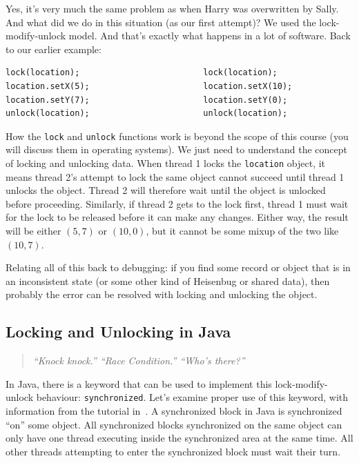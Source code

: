 Yes, it's very much the same problem as when Harry was overwritten by Sally. And what did we do in this situation (as our first attempt)? We used the lock-modify-unlock model. And that's exactly what happens in a lot of software. Back to our earlier example:

\begin{verbatim}
lock(location);                         lock(location);
location.setX(5);                       location.setX(10);
location.setY(7);                       location.setY(0);
unlock(location);                       unlock(location);
\end{verbatim}


How the \texttt{lock} and \texttt{unlock} functions work is beyond the scope of this course (you will discuss them in operating systems). We just need to understand the concept of locking and unlocking data. When thread 1 locks the \texttt{location} object, it means thread 2's attempt to lock the same object cannot succeed until thread 1 unlocks the object. Thread 2 will therefore wait until the object is unlocked before proceeding. Similarly, if thread 2 gets to the lock first, thread 1 must wait for the lock to be released before it can make any changes. Either way, the result will be either $(5,7)$ or $(10,0)$, but it cannot be some mixup of the two like $(10, 7)$.

Relating all of this back to debugging: if you find some record or object that is in an inconsistent state (or some other kind of Heisenbug or shared data), then probably the error can be resolved with locking and unlocking the object.


\subsection*{Locking and Unlocking in Java}

\begin{quote}
\textit{``Knock knock.'' ``Race Condition.'' ``Who's there?''}
\end{quote}


In Java, there is a keyword that can be used to implement this lock-modify-unlock behaviour: \texttt{synchronized}. Let's examine proper use of this keyword, with information from the tutorial in~\cite{jenkov}. A synchronized block in Java is synchronized ``on'' some object. All synchronized blocks synchronized on the same object can only have one thread executing inside the synchronized area at the same time. All other threads attempting to enter the synchronized block must wait their turn.


